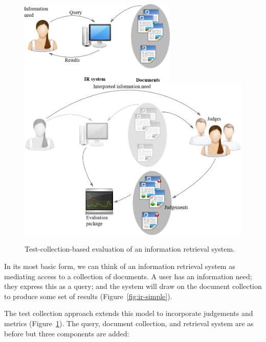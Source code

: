 \documentclass[openany]{now} %
\begin{document}
\begin{figure}
	{
	\includegraphics[width=0.67\textwidth]{images/ir-model}
	\label{fig:ir-simple}
	}\vspace*{3em}
	{
	\includegraphics[width=\textwidth]{images/ir-model-with-judges}
	\label{fig:ir-with-judges}
	}\vspace*{3em}
	\caption{Test-collection-based evaluation of an information retrieval system.}
\end{figure}

In its most basic form, we can think of an information retrieval system as mediating access to a collection of documents. A user has an information need; they express this as a query; and the system will draw on the document collection to produce some set of results (Figure~\ref{fig:ir-simple}).

The test collection approach extends this model to incorporate judgements and metrics (Figure~\ref{fig:ir-with-judges}). The query, document collection, and retrieval system are as before but three components are added:
\end{document}
